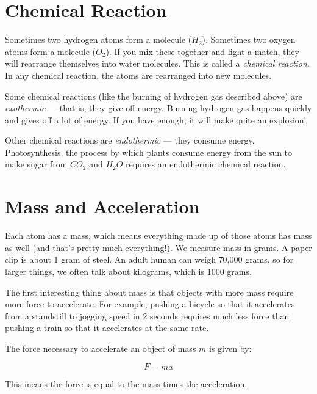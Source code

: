 \section{Chemical Reaction}

Sometimes two hydrogen atoms form a molecule ($H_2$). Sometimes two
oxygen atoms form a molecule ($O_2$). If you mix these
together and light a match, they will rearrange themselves into water
molecules. This is called a \textit{chemical reaction}. In any
chemical reaction, the atoms are rearranged into new molecules.

Some chemical reactions (like the burning of hydrogen gas described
above) are \textit{exothermic} --- that is, they give off energy.
Burning hydrogen gas happens quickly and gives off a lot of energy. If
you have enough, it will make quite an explosion!

Other chemical reactions are \textit{endothermic} --- they consume
energy. Photosynthesis, the process by which plants consume energy
from the sun to make sugar from $CO_2$ and $H_2O$ requires an endothermic
chemical reaction.


\section{Mass and Acceleration}

Each atom has a mass, which means everything made up of those atoms has mass as well (and that's pretty much everything!). We measure mass in grams. A
paper clip is about 1 gram of steel. An adult human can weigh 70,000
grams, so for larger things, we often talk about kilograms, which
is 1000 grams.

The first interesting thing about mass is that objects with more mass
require more force to accelerate. For example, pushing a bicycle so
that it accelerates from a standstill to jogging speed in 2 seconds
requires much less force than pushing a train so that it accelerates
at the same rate.


\begin{mdframed}[style=important, frametitle={Newton's Second Law of Motion}]

The force necessary to accelerate an object of mass $m$ is given by:

$$F = m a$$

This means the force is equal to the mass times the acceleration.

\end{mdframed}


